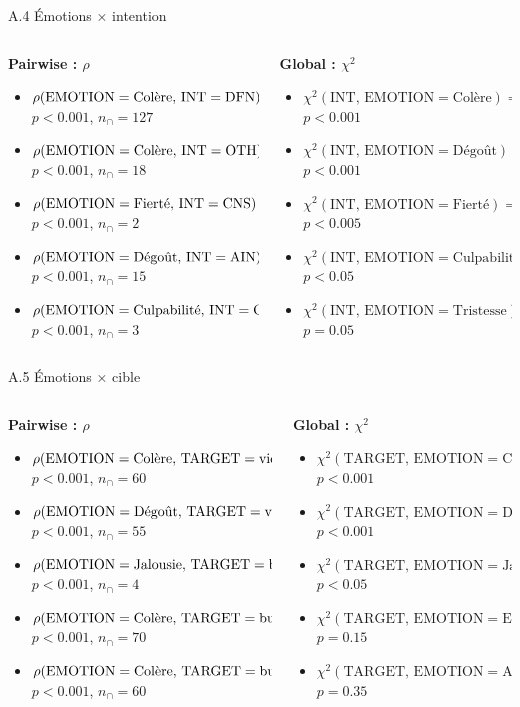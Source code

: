 \documentclass[aspectratio=169,10pt,xcolor=table]{beamer}
\newcommand{\pval}[1]{\ensuremath{#1}}
\newcommand{\pos}[1]{\textcolor{Positive}{#1}}
\newcommand{\negcorr}[1]{\textcolor{Negative}{#1}}
\newcommand{\rhoitem}[7]{\item \(\rho(\mathrm{#1}=\text{#2},\,\mathrm{#3}=\text{#4}) = #5\)\\[-0.15em]{\tiny \(p\pval{#6}\), \(n_{\cap}=#7\)}}
\newcommand{\chiitem}[5]{\item \(\chi^2(\mathrm{#1},\,\mathrm{#2}=\text{#3}) = #4\)\\[-0.15em]{\tiny \(p\pval{#5}\)}}
\begin{document}
\begin{frame}{A.4 Émotions × intention}
\scriptsize
\begin{columns}[T,onlytextwidth]
\begin{column}{0.49\textwidth}
\textbf{Pairwise : \(\rho\)}
\begin{itemize}
\setlength\itemsep{0.55em}
\rhoitem{EMOTION}{Colère}{INT}{DFN}{\pos{0.25}}{<0.001}{127}
\rhoitem{EMOTION}{Colère}{INT}{OTH}{\negcorr{-0.18}}{<0.001}{18}
\rhoitem{EMOTION}{Fierté}{INT}{CNS}{\pos{0.16}}{<0.001}{2}
\rhoitem{EMOTION}{Dégoût}{INT}{AIN}{\pos{0.16}}{<0.001}{15}
\rhoitem{EMOTION}{Culpabilité}{INT}{OTH}{\pos{0.15}}{<0.001}{3}
\end{itemize}
\end{column}
\begin{column}{0.49\textwidth}
\textbf{Global : \(\chi^2\)}
\begin{itemize}
\setlength\itemsep{0.55em}
\chiitem{INT}{EMOTION}{Colère}{72.93}{<0.001}
\chiitem{INT}{EMOTION}{Dégoût}{50.45}{<0.001}
\chiitem{INT}{EMOTION}{Fierté}{22.55}{<0.005}
\chiitem{INT}{EMOTION}{Culpabilité}{17.99}{<0.05}
\chiitem{INT}{EMOTION}{Tristesse}{14.26}{=0.05}
\end{itemize}
\end{column}
\end{columns}
\end{frame}

\begin{frame}{A.5 Émotions × cible}
\scriptsize
\begin{columns}[T,onlytextwidth]
\begin{column}{0.49\textwidth}
\textbf{Pairwise : \(\rho\)}
\begin{itemize}
\setlength\itemsep{0.55em}
\rhoitem{EMOTION}{Colère}{TARGET}{victim}{\negcorr{-0.27}}{<0.001}{60}
\rhoitem{EMOTION}{Dégoût}{TARGET}{victim}{\pos{0.25}}{<0.001}{55}
\rhoitem{EMOTION}{Jalousie}{TARGET}{bully\_support}{\pos{0.18}}{<0.001}{4}
\rhoitem{EMOTION}{Colère}{TARGET}{bully}{\pos{0.17}}{<0.001}{70}
\rhoitem{EMOTION}{Colère}{TARGET}{bully\_support}{\pos{0.16}}{<0.001}{60}
\end{itemize}
\end{column}
\begin{column}{0.49\textwidth}
\textbf{Global : \(\chi^2\)}
\begin{itemize}
\setlength\itemsep{0.55em}
\chiitem{TARGET}{EMOTION}{Colère}{52.89}{<0.001}
\chiitem{TARGET}{EMOTION}{Dégoût}{36.91}{<0.001}
\chiitem{TARGET}{EMOTION}{Jalousie}{21.17}{<0.05}
\chiitem{TARGET}{EMOTION}{Embarras}{13.24}{=0.15}
\chiitem{TARGET}{EMOTION}{Autre}{10.00}{=0.35}
\end{itemize}
\end{column}
\end{columns}
\end{frame}
\end{document}
